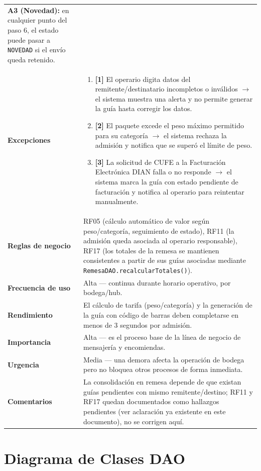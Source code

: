 \documentclass[11pt,a4paper]{article}
\begin{document}
{\begin{longtable}{L{3.2cm} L{11.3cm}}
\textbf{A3 (Novedad):} en cualquier punto del paso 6, el estado puede pasar a \texttt{NOVEDAD} si el envío queda retenido. \\
\textbf{Excepciones} &
\begin{enumerate}[nosep,leftmargin=*]
  \item \textbf{[1]} El operario digita datos del remitente/destinatario incompletos o inválidos $\rightarrow$ el sistema muestra una alerta y no permite generar la guía hasta corregir los datos.
  \item \textbf{[2]} El paquete excede el peso máximo permitido para su categoría $\rightarrow$ el sistema rechaza la admisión y notifica que se superó el límite de peso.
  \item \textbf{[3]} La solicitud de CUFE a la Facturación Electrónica DIAN falla o no responde $\rightarrow$ el sistema marca la guía con estado pendiente de facturación y notifica al operario para reintentar manualmente.
\end{enumerate} \\
\textbf{Reglas de negocio} & RF05 (cálculo automático de valor según peso/categoría, seguimiento de estado), RF11 (la admisión queda asociada al operario responsable), RF17 (los totales de la remesa se mantienen consistentes a partir de sus guías asociadas mediante \texttt{RemesaDAO.recalcularTotales()}). \\
\textbf{Frecuencia de uso} & Alta --- continua durante horario operativo, por bodega/hub. \\
\textbf{Rendimiento} & El cálculo de tarifa (peso/categoría) y la generación de la guía con código de barras deben completarse en menos de 3 segundos por admisión. \\
\textbf{Importancia} & Alta --- es el proceso base de la línea de negocio de mensajería y encomiendas. \\
\textbf{Urgencia} & Media --- una demora afecta la operación de bodega pero no bloquea otros procesos de forma inmediata. \\
\textbf{Comentarios} & La consolidación en remesa depende de que existan guías pendientes con mismo remitente/destino; RF11 y RF17 quedan documentados como hallazgos pendientes (ver aclaración ya existente en este documento), no se corrigen aquí. \\
\bottomrule
\end{longtable}
}

\section{Diagrama de Clases DAO}
\end{document}
